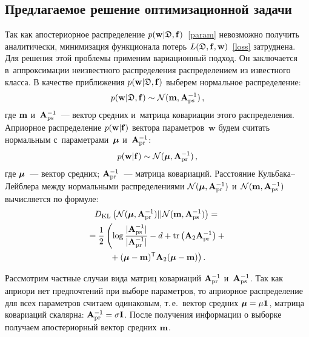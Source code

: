 \begin{multicols}{2}
\section{Предлагаемое решение оптимизационной задачи}

Так как апостериорное распределение $p(\mathbf{w}|\mathfrak{D},{\mathbf{f}})$~\eqref{param} невозможно 
получить аналитически, минимизация функционала потерь 
$L(\mathfrak{D},{\mathbf{f}},\mathbf{w})$~\eqref{loss} затруднена. Для решения этой проблемы применим вариационный подход. 
Он заключается в~аппроксимации неизвестного распределения распределением из 
известного класса.
В качестве приближения $p(\mathbf{w}|\mathfrak{D},{\mathbf{f}})$ выберем нормальное распределение:
$$
p(\mathbf{w}|\mathfrak{D},{\mathbf{f}}) \sim \mathcal{N}(\mathbf{m},\mathbf{A}^{-1}_{\mathrm{ps}})\,,
$$
где $\mathbf{m}$ и~$\mathbf{A}^{-1}_{\mathrm{ps}}$~--- вектор средних и~матрица ковариации этого распределения.
Априорное распределение $p(\mathbf{w}|{\mathbf{f}})$ вектора параметров~$\mathbf{w}$ будем считать 
нормальным с~параметрами~$\boldsymbol{\mu}$ и~$\mathbf{A}^{-1}_{\mathrm{pr}}$:
$$
p(\mathbf{w}|{\mathbf{f}}) \sim \mathcal{N}(\boldsymbol{\mu},\mathbf{A}^{-1}_{\mathrm{pr}})\,,
$$
где $\boldsymbol{\mu}$~--- вектор средних; $\mathbf{A}^{-1}_{\mathrm{pr}}$~--- матрица ковариаций.
Расстояние Кульбака--Лейблера между нормальными распределениями 
$\mathcal{N}(\boldsymbol{\mu},\mathbf{A}^{-1}_{\mathrm{pr}})$ и~$\mathcal{N}(\mathbf{m},\mathbf{A}^{-1}_{\mathrm{ps}})$ вычисляется по формуле:
\begin{multline*}
D_{\mathrm{KL}}\left(\mathcal{N}(\boldsymbol{\mu},\mathbf{A}^{-1}_{\mathrm{pr}})||\mathcal{N}(\mathbf{m},\mathbf{A}^{-1}_{\mathrm{ps}})\right) 
= {}\\
{}=\displaystyle\frac{\displaystyle 1\mathstrut}{\displaystyle 2\mathstrut} \left(\log 
\displaystyle\frac{\displaystyle |\mathbf{A}^{-1}_{\mathrm{ps}}|\mathstrut}{\displaystyle |\mathbf{A}^{-1}_{\mathrm{pr}}|\mathstrut}-d+\mathrm{tr}\left(\mathbf{A}_2\mathbf{A}^{-1}_{\mathrm{pr}}\right) + {}\right.\\
\left.{}+(\boldsymbol{\mu}-
\mathbf{m})^{\mathsf{T}}\mathbf{A}_2(\boldsymbol{\mu}-\mathbf{m}) \right). 
\end{multline*}

Рассмотрим частные случаи вида матриц ковариаций $\mathbf{A}^{-1}_{\mathrm{pr}}$ и~$\mathbf{A}^{-1}_{\mathrm{ps}}$. Так как 
априори нет предпочтений при выборе параметров, то априорное распределение для 
всех параметров считаем одинаковым, т.\,е.\ вектор средних $\mupr \hm= \mu 
\boldsymbol{1}$, матрица ковариаций скалярна: $\bApr\hm = \sigma\mathbf{I}$.
После получения информации о выборке получаем апостериорный вектор средних 
$\mathbf{m}$.



\end{multicols}
